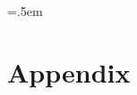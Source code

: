\begingroup\emergencystretch=.5em
\let\clearpage\relax
\let\cleardoublepage\relax
\let\cleardoublepage\relax

\chapter*{Appendix}


\vfill

\endgroup			

\vfill